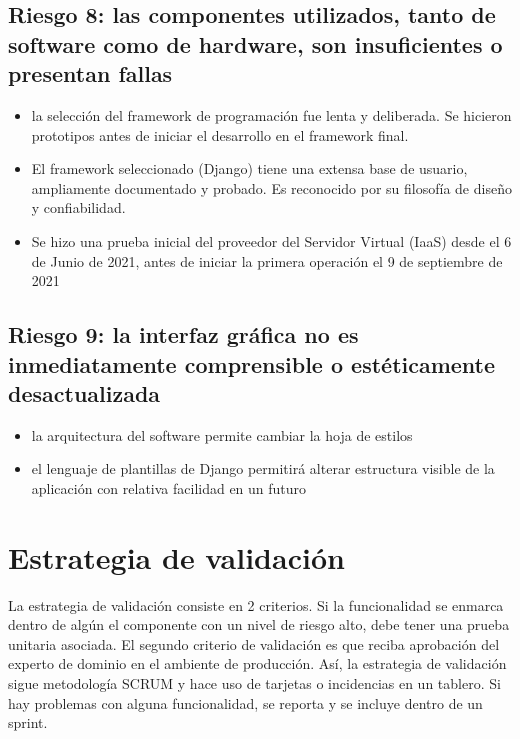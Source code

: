 \documentclass[letterpaper,10pt,spanish]{sphinxmanual}
\begin{document}
\subsection{Riesgo 8: las componentes utilizados, tanto de software como de hardware,  son insuficientes o presentan fallas}
\label{\detokenize{requerimientos/resumen_validacion:riesgo-8-las-componentes-utilizados-tanto-de-software-como-de-hardware-son-insuficientes-o-presentan-fallas}}\begin{itemize}
\item {} 
la selección del framework de programación fue lenta y deliberada. Se hicieron prototipos antes de iniciar el desarrollo en el framework final.

\item {} 
El framework seleccionado (Django) tiene una extensa base de usuario, ampliamente documentado y probado. Es reconocido por su filosofía de diseño y confiabilidad.

\item {} 
Se hizo una prueba inicial del proveedor del Servidor Virtual (IaaS) desde el 6 de Junio de 2021, antes de iniciar la primera operación el 9 de septiembre de 2021

\end{itemize}


\subsection{Riesgo 9: la interfaz gráfica no es inmediatamente comprensible o estéticamente desactualizada}
\label{\detokenize{requerimientos/resumen_validacion:riesgo-9-la-interfaz-grafica-no-es-inmediatamente-comprensible-o-esteticamente-desactualizada}}\begin{itemize}
\item {} 
la arquitectura del software permite cambiar la hoja de estilos

\item {} 
el lenguaje de plantillas de Django permitirá alterar estructura visible de la aplicación con relativa facilidad en un futuro

\end{itemize}


\section{Estrategia de validación}
\label{\detokenize{requerimientos/resumen_validacion:estrategia-de-validacion}}
La estrategia de validación consiste en 2 criterios. Si la
funcionalidad se enmarca dentro de algún el componente con un nivel de
riesgo alto, debe tener una prueba unitaria asociada. El segundo
criterio de validación es que reciba aprobación del experto de dominio
en el ambiente de producción. Así, la estrategia de validación sigue
metodología SCRUM y hace uso de tarjetas o incidencias en un
tablero. Si hay problemas con alguna funcionalidad, se reporta y se
incluye dentro de un sprint.
\end{document}
